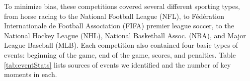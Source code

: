 \documentclass[letterpaper]{article}
\begin{document}
To minimize bias, these competitions covered several different sporting types, from horse racing to the National Football League (NFL), to F\'{e}d\'{e}ration Internationale de Football Association (FIFA) premier league soccer, to the National Hockey League (NHL), National Basketball Assoc. (NBA), and Major League Baseball (MLB). 
Each competition also contained four basic types of events: beginning of the game, end of the game, scores, and penalties.
Table \ref{tab:eventStats} lists sources of events we identified and the number of key moments in each.
%
\end{document}
